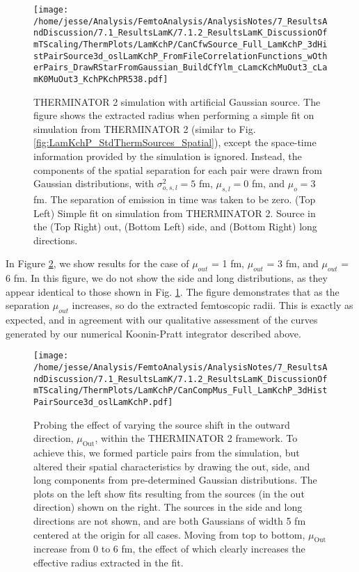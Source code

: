 \documentclass[/home/jesse/Analysis/FemtoAnalysis/AnalysisNotes/AnalysisNoteJBuxton.tex]{subfiles}
\begin{document}
\begin{figure}[h]
  \centering
  \texttt{[image: /home/jesse/Analysis/FemtoAnalysis/AnalysisNotes/7\_ResultsAndDiscussion/7.1\_ResultsLamK/7.1.2\_ResultsLamK\_DiscussionOfmTScaling/ThermPlots/LamKchP/CanCfwSource\_Full\_LamKchP\_3dHistPairSource3d\_oslLamKchP\_FromFileCorrelationFunctions\_wOtherPairs\_DrawRStarFromGaussian\_BuildCfYlm\_cLamcKchMuOut3\_cLamK0MuOut3\_KchPKchPR538.pdf]}
  \caption[THERMINATOR 2 simulation with artificial Gaussian source]
  {
  THERMINATOR 2 simulation with artificial Gaussian source.
  The figure shows the extracted radius when performing a simple fit on simulation from THERMINATOR 2 (similar to Fig. \ref{fig:LamKchP_StdThermSources_Spatial}), except the space-time information provided by the simulation is ignored.
  Instead, the components of the spatial separation for each pair were drawn from Gaussian distributions, with $\sigma^{2}_{o,s,l} = 5$ fm, $\mu_{s,l} = 0$ fm, and $\mu_{o} = 3$ fm.
  The separation of emission in time was taken to be zero.
  (Top Left) Simple fit on simulation from THERMINATOR 2. 
  Source in the (Top Right) out, (Bottom Left) side, and (Bottom Right) long directions.
  }
  \label{fig:LamKchP_ThermSources_GaussianSourceEx}
\end{figure}


In Figure \ref{fig:LamKchP_ThermSources_VaryMuOut}, we show results for the case of $\mu_{out}$ = 1 fm, $\mu_{out}$ = 3 fm, and $\mu_{out}$ = 6 fm.
In this figure, we do not show the side and long distributions, as they appear identical to those shown in Fig. \ref{fig:LamKchP_ThermSources_GaussianSourceEx}.
The figure demonstrates that as the separation $\mu_{out}$ increases, so do the extracted femtoscopic radii.
This is exactly as expected, and in agreement with our qualitative assessment of the curves generated by our numerical Koonin-Pratt integrator described above.


\begin{figure}[h]
  \centering
  \texttt{[image: /home/jesse/Analysis/FemtoAnalysis/AnalysisNotes/7\_ResultsAndDiscussion/7.1\_ResultsLamK/7.1.2\_ResultsLamK\_DiscussionOfmTScaling/ThermPlots/LamKchP/CanCompMus\_Full\_LamKchP\_3dHistPairSource3d\_oslLamKchP.pdf]}
  \caption[Varying $\mu_{\mathrm{Out}}$ with THERMINATOR 2]{Probing the effect of varying the source shift in the outward direction, $\mu_{\mathrm{Out}}$, within the THERMINATOR 2 framework.  To achieve this, we formed particle pairs from the simulation, but altered their spatial characteristics by drawing the out, side, and long components from pre-determined Gaussian distributions.  The plots on the left show fits resulting from the sources (in the out direction) shown on the right.  The sources in the side and long directions are not shown, and are both Gaussians of width 5 fm centered at the origin for all cases.  Moving from top to bottom, $\mu_{\mathrm{Out}}$ increase from 0 to 6 fm, the effect of which clearly increases the effective radius extracted in the fit.}
  \label{fig:LamKchP_ThermSources_VaryMuOut}
\end{figure}
\end{document}
